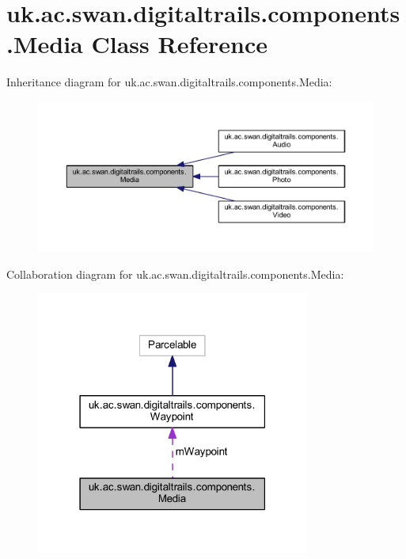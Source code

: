 \hypertarget{classuk_1_1ac_1_1swan_1_1digitaltrails_1_1components_1_1_media}{\section{uk.\+ac.\+swan.\+digitaltrails.\+components.\+Media Class Reference}
\label{classuk_1_1ac_1_1swan_1_1digitaltrails_1_1components_1_1_media}
}


Inheritance diagram for uk.\+ac.\+swan.\+digitaltrails.\+components.\+Media\+:\nopagebreak
\begin{figure}[H]
\begin{center}
\leavevmode
\includegraphics[width=350pt]{classuk_1_1ac_1_1swan_1_1digitaltrails_1_1components_1_1_media__inherit__graph}
\end{center}
\end{figure}


Collaboration diagram for uk.\+ac.\+swan.\+digitaltrails.\+components.\+Media\+:\nopagebreak
\begin{figure}[H]
\begin{center}
\leavevmode
\includegraphics[width=255pt]{classuk_1_1ac_1_1swan_1_1digitaltrails_1_1components_1_1_media__coll__graph}
\end{center}
\end{figure}
